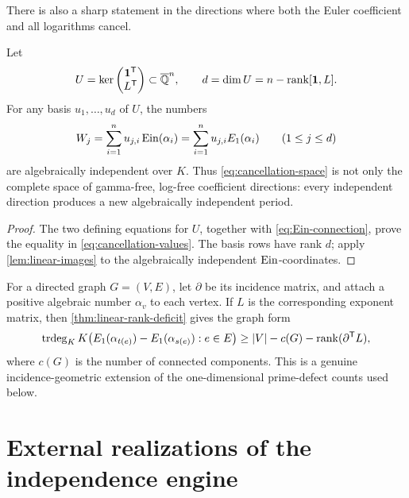 There is also a sharp statement in the directions where both the Euler
coefficient and all logarithms cancel.

\begin{corollary}
\label{cor:complete-cancellation-space}
Let
\begin{equation}\label{eq:cancellation-space}
 U=\ker\begin{pmatrix}\mathbf1^{\mathsf T}\\L^{\mathsf T}\end{pmatrix}
 \subset\overline{\mathbb Q}^n,
 \qquad
 d=\dim U=n-\operatorname{rank}[\mathbf1,L].
\end{equation}
For any basis \(u_1,\ldots,u_d\) of \(U\), the numbers
\begin{equation}\label{eq:cancellation-values}
 W_j=\sum_{i=1}^n u_{j,i}\operatorname{Ein}(\alpha_i)
     =\sum_{i=1}^n u_{j,i}E_1(\alpha_i)
 \qquad(1\le j\le d)
\end{equation}
are algebraically independent over \(K\).  Thus
\eqref{eq:cancellation-space} is not only the complete space of
gamma-free, log-free coefficient directions: every independent direction
produces a new algebraically independent period.
\end{corollary}

\begin{proof}
The two defining equations for \(U\), together with
\eqref{eq:Ein-connection}, prove the equality in
\eqref{eq:cancellation-values}.  The basis rows have rank \(d\); apply
\cref{lem:linear-images} to the algebraically independent \(\operatorname{Ein}\)-coordinates.
\end{proof}

For a directed graph \(G=(V,E)\), let \(\partial\) be its incidence matrix,
and attach a positive algebraic number \(\alpha_v\) to each vertex.  If
\(L\) is the corresponding exponent matrix, then
\cref{thm:linear-rank-deficit} gives the graph form
\begin{equation}\label{eq:graph-rank-deficit}
 \operatorname{trdeg}_KK\bigl(E_1(\alpha_{t(e)})-E_1(\alpha_{s(e)}):e\in E\bigr)
 \ge |V|-c(G)-\operatorname{rank}(\partial^{\mathsf T}L),
\end{equation}
where \(c(G)\) is the number of connected components.  This is a genuine
incidence-geometric extension of the one-dimensional prime-defect counts
used below.

\section{External realizations of the independence engine}
\label{sec:external-realizations}


